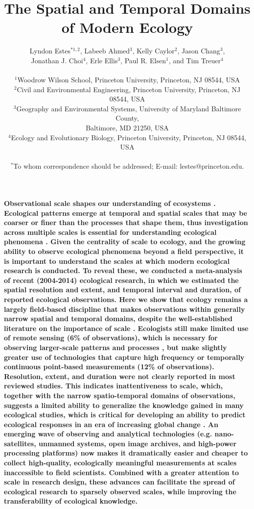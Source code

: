 \documentclass[12pt]{article}
\title{The Spatial and Temporal Domains of Modern Ecology }%
\author
{Lyndon Estes$^{\ast1, 2}$, Labeeb Ahmed$^{3}$, Kelly Caylor$^{2}$, Jason Chang$^{3}$, \\
Jonathan J. Choi$^{4}$, Erle Ellis$^{3}$, Paul R. Elsen$^{1}$, and Tim Treuer$^{4}$ \\
\\
\normalsize{$^{1}$Woodrow Wilson School, Princeton University, Princeton, NJ 08544, USA}\\
\normalsize{$^{2}$Civil and Environmental Engineering, Princeton University, Princeton, NJ 08544, USA}\\
\normalsize{$^{3}$Geography and Environmental Systems, University of Maryland Baltimore County,}\\
\normalsize{Baltimore, MD 21250, USA}\\
\normalsize{$^{4}$Ecology and Evolutionary Biology, Princeton University, Princeton, NJ 08544, USA}\\
\\
\normalsize{$^\ast$To whom correspondence should be addressed; E-mail:  lestes@princeton.edu.}
}
\date{}
\newenvironment{sciabstract}{%
\begin{quote} \bf}
{\end{quote}}
\begin{document}
 


\baselineskip24pt


\maketitle 




\textbf{Observational scale shapes our understanding of ecosystems \cite{levin_problem_1992,chave_problem_2013,wiens_spatial_1989}. Ecological patterns emerge at temporal and spatial scales that may be coarser or finer than the processes that shape them, thus investigation across multiple scales is essential for understanding ecological phenomena \cite{levin_problem_1992}. Given the centrality of scale to ecology, and the growing ability to observe ecological phenomena beyond a field perspective, it is important to understand the scales at which modern ecological research is conducted. To reveal these, we conducted a meta-analysis of recent (2004-2014) ecological research, in which we estimated the spatial resolution and extent, and temporal interval and duration, of reported ecological observations. Here we show that ecology remains a largely field-based discipline that makes observations within generally narrow spatial and temporal domains, despite the well-established literature on the importance of scale \cite{levin_problem_1992,chave_problem_2013,wiens_spatial_1989}. Ecologists still make limited use of remote sensing (6\% of observations), which is necessary for observing larger-scale patterns and processes \cite{turner_remote_2003,pettorelli_satellite_2014}, but make slightly greater use of technologies that capture high frequency or temporally continuous point-based measurements (12\% of observations). Resolution, extent, and duration were not clearly reported in most reviewed studies. This indicates inattentiveness to scale, which, together with the narrow spatio-temporal domains of observations, suggests a limited ability to generalize the knowledge gained in many ecological studies, which is critical for developing an ability to predict ecological responses in an era of increasing global change \cite{levin_problem_1992}. An emerging wave of observing and analytical technologies (e.g. nano-satellites, unmanned systems, open image archives, and high-power processing platforms) now makes it dramatically easier and cheaper to collect high-quality, ecologically meaningful measurements at scales inaccessible to field scientists. Combined with a greater attention to scale in research design, these advances can facilitate the spread of ecological research to sparsely observed scales, while improving the transferability of ecological knowledge.}
\end{document}
